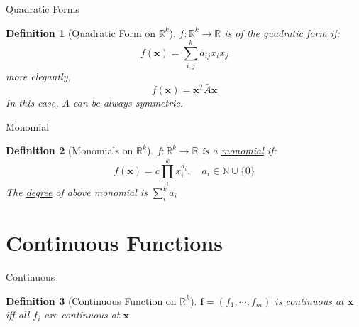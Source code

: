 \documentclass[a4paper,11pt]{article}
\newtheorem{defn}{Definition}
\begin{document}
\begin{frame}[t]{Quadratic Forms}
	\begin{defn}
		[Quadratic Form on $\mathbb{R}^k$]
		$f:\mathbb{R}^k\rightarrow\mathbb{R}$ is of the \uline{quadratic form} if:
		\[
			f(\mathbf{x})=\sum_{i,j}^k \bar a_{ij} x_i x_j
		\]more elegantly, 
		\[
			f(\mathbf{x}) = \mathbf{x}^T \bar A \mathbf{x}
		\]
		In this case, $A$ can be always symmetric.
	\end{defn}
\end{frame}
\begin{frame}[t]{Monomial}
	\begin{defn}
		[Monomials on $\mathbb{R}^k$]
		$f:\mathbb{R}^k\rightarrow\mathbb{R}$ is a \uline{monomial} if:\[
			f(\mathbf{x})= \bar c \prod_{i}^k x_i^{\bar{a_i}}, \quad a_i\in\mathbb{N}\cup\{0\}
		\]
		The \uline{degree} of above monomial is $\sum_i^k a_i$
	\end{defn}
\end{frame}

\section{Continuous Functions} %
\label{sec:continuous_functions}
\begin{frame}[t]{Continuous}
	\begin{defn}
		[Continuous Function on $\mathbb{R}^k$]
		$\mathbf{f}=(f_1,\cdots,f_m)$ is \uline{continuous} at $\mathbf{x}$ iff all $f_i$ are continuous at $\mathbf{x}$
	\end{defn}
\end{frame}

%
\end{document}
